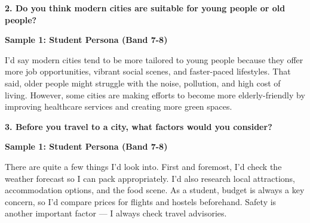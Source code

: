 \separator

\begin{ieltsquestion}
\textbf{2. Do you think modern cities are suitable for young people or old people?}
\end{ieltsquestion}
\textbf{Sample 1: Student Persona (Band 7-8)}

I'd say modern cities tend to be more tailored to young people because they offer more job opportunities, vibrant social scenes, and faster-paced lifestyles. That said, older people might struggle with the noise, pollution, and high cost of living. However, some cities are making efforts to become more elderly-friendly by improving healthcare services and creating more green spaces.

\separator

\begin{ieltsquestion}
\textbf{3. Before you travel to a city, what factors would you consider?}
\end{ieltsquestion}
\textbf{Sample 1: Student Persona (Band 7-8)}

There are quite a few things I'd look into. First and foremost, I'd check the weather forecast so I can pack appropriately. I'd also research local attractions, accommodation options, and the food scene. As a student, budget is always a key concern, so I'd compare prices for flights and hostels beforehand. Safety is another important factor — I always check travel advisories.

\separator


